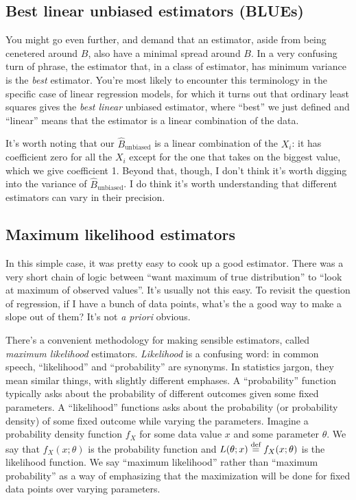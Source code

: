 \subsection{Best linear unbiased estimators (BLUEs)}

You might go even further, and demand that an estimator, aside from being
cenetered around $B$, also have a minimal spread around $B$. In a very
confusing turn of phrase, the estimator that, in a class of estimator, has
minimum variance is the \emph{best} estimator. You're most likely to encounter
this terminology in the specific case of linear regression models, for which
it turns out that ordinary least squares gives the \emph{best linear} unbiased
estimator, where ``best'' we just defined and ``linear'' means that the
estimator is a linear combination of the data.

It's worth noting that our $\hat{B}_\text{unbiased}$ is a linear combination
of the $X_i$: it has coefficient zero for all the $X_i$ except for the one
that takes on the biggest value, which we give coefficient 1. Beyond that,
though, I don't think it's worth digging into the variance of
$\hat{B}_\text{unbiased}$. I do think it's worth understanding that different
estimators can vary in their precision.

\subsection{Maximum likelihood estimators}

In this simple case, it was pretty easy to cook up a good estimator. There was
a very short chain of logic between ``want maximum of true distribution'' to
``look at maximum of observed values''. It's usually not this easy. To revisit
the question of regression, if I have a bunch of data points, what's the a
good way to make a slope out of them? It's not \textit{a priori} obvious.

There's a convenient methodology for making sensible estimators, called
\emph{maximum likelihood} estimators. \emph{Likelihood} is a confusing word:
in common speech, ``likelihood'' and ``probability'' are synonyms. In
statistics jargon, they mean similar things, with slightly different emphases.
A ``probability'' function typically asks about the probability of different
outcomes given some fixed parameters. A ``likelihood'' functions asks about
the probability (or probability density) of some fixed outcome while varying
the parameters. Imagine a probability density function $f_X$ for some data
value $x$ and some parameter $\theta$. We say that $f_X(x; \theta)$ is the
probability function and $L(\theta; x) \stackrel{\text{def}}{=} f_X(x; \theta)$ is the
likelihood function. We say ``maximum likelihood'' rather than ``maximum
probability'' as a way of emphasizing that the maximization will be done for
fixed data points over varying parameters.

